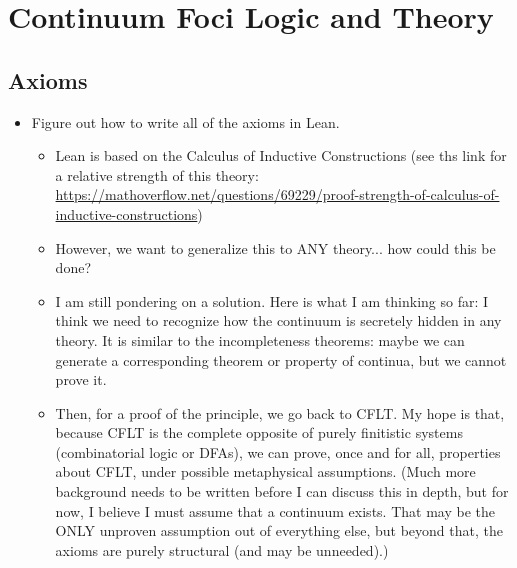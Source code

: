 
\chapter{Continuum Foci Logic and Theory}
\label{ch:cflt}

\section{Axioms}
\begin{itemize}
  \item Figure out how to write all of the axioms in Lean.
    \begin{itemize}
      \item Lean is based on the Calculus of Inductive Constructions (see ths link for a relative strength of this theory: \url{https://mathoverflow.net/questions/69229/proof-strength-of-calculus-of-inductive-constructions})
      \item However, we want to generalize this to ANY theory... how could this be done?
      \item I am still pondering on a solution. Here is what I am thinking so far: I think we need to recognize how the continuum is secretely hidden in any theory. It is similar to the incompleteness theorems: maybe we can generate a corresponding theorem or property of continua, but we cannot prove it.
      \item Then, for a proof of the principle, we go back to CFLT. My hope is that, because CFLT is the complete opposite of purely finitistic systems (combinatorial logic or DFAs), we can prove, once and for all, properties about CFLT, under possible metaphysical assumptions. (Much more background needs to be written before I can discuss this in depth, but for now, I believe I must assume that a continuum exists. That may be the ONLY unproven assumption out of everything else, but beyond that, the axioms are purely structural (and may be unneeded).)

  \end{itemize}
\end{itemize}


